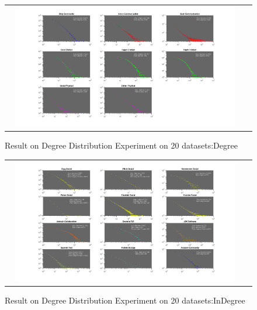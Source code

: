 \begin{figure}[H]
\begin{center}
\begin{tabular}{cc}
     \includegraphics[width=0.95\textwidth]{FIG/degree2.png}
\end{tabular}
\caption{Result on Degree Distribution Experiment on 20 datasets:Degree}
\end{center}
\end{figure}

\begin{figure}[H]
\begin{center}
\begin{tabular}{cc}
     \includegraphics[width=0.95\textwidth]{FIG/indegree1.png}
\end{tabular}
\caption{Result on Degree Distribution Experiment on 20 datasets:InDegree}
\end{center}
\end{figure}

